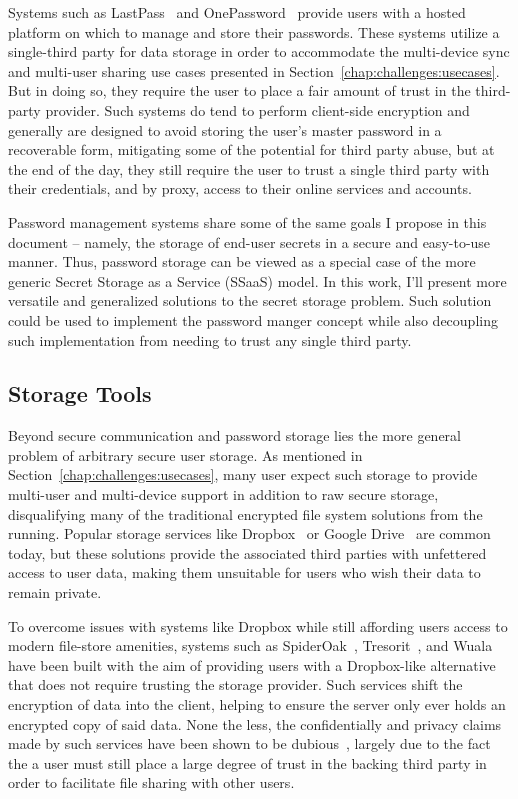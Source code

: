 Systems such as LastPass~\cite{lastpass} and
OnePassword~\cite{onepassword} provide users with a hosted platform on
which to manage and store their passwords. These systems utilize a
single-third party for data storage in order to accommodate the
multi-device sync and multi-user sharing use cases presented in
Section~\ref{chap:challenges:usecases}. But in doing so, they require
the user to place a fair amount of trust in the third-party
provider. Such systems do tend to perform client-side encryption and
generally are designed to avoid storing the user's master password in
a recoverable form, mitigating some of the potential for third party
abuse, but at the end of the day, they still require the user to trust
a single third party with their credentials, and by proxy, access to
their online services and accounts.

Password management systems share some of the same goals I propose in
this document -- namely, the storage of end-user secrets in a secure
and easy-to-use manner. Thus, password storage can be viewed as a
special case of the more generic Secret Storage as a Service (SSaaS)
model. In this work, I'll present more versatile and generalized
solutions to the secret storage problem. Such solution could be used
to implement the password manger concept while also decoupling such
implementation from needing to trust any single third party.

\subsection{Storage Tools}

Beyond secure communication and password storage lies the more general
problem of arbitrary secure user storage. As mentioned in
Section~\ref{chap:challenges:usecases}, many user expect such storage
to provide multi-user and multi-device support in addition to raw
secure storage, disqualifying many of the traditional encrypted file
system solutions from the running. Popular storage services like
Dropbox~\cite{dropbox} or Google Drive~\cite{google-drive} are common
today, but these solutions provide the associated third parties with
unfettered access to user data, making them unsuitable for users who
wish their data to remain private.

To overcome issues with systems like Dropbox while still affording
users access to modern file-store amenities, systems such as
SpiderOak~\cite{spideroak}, Tresorit~\cite{tresorit}, and
Wuala~\cite{wuala} have been built with the aim of providing users
with a Dropbox-like alternative that does not require trusting the
storage provider. Such services shift the encryption of data into the
client, helping to ensure the server only ever holds an encrypted copy
of said data. None the less, the confidentially and privacy claims
made by such services have been shown to be dubious~\cite{Wilson2014},
largely due to the fact the a user must still place a large degree of
trust in the backing third party in order to facilitate file sharing
with other users.

